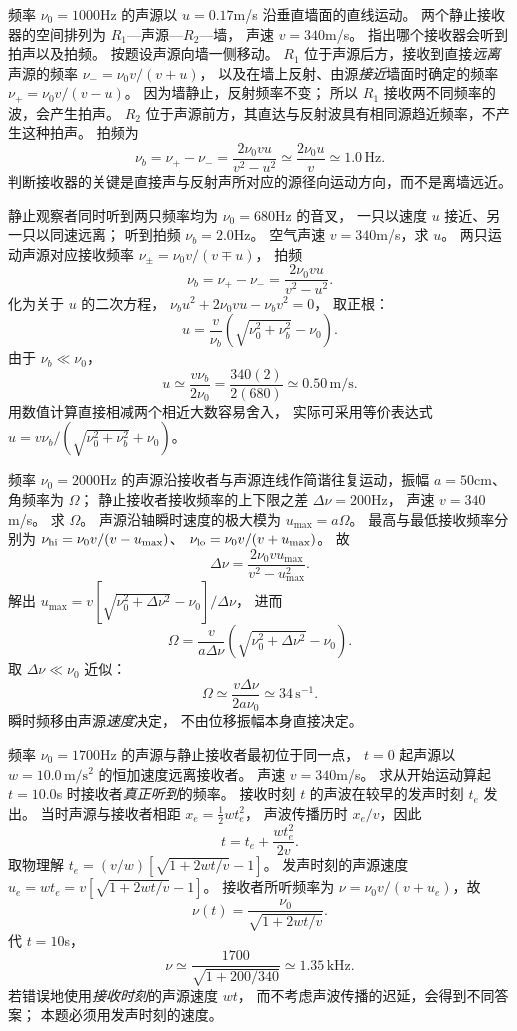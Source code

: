 频率 $\nu_0=1000$Hz 的声源以
$u=0.17$m/s 沿垂直墙面的直线运动。
两个静止接收器的空间排列为
$R_1$—声源—$R_2$—墙，
声速 $v=340$m/s。
指出哪个接收器会听到拍声以及拍频。
\exsolution
按题设声源向墙一侧移动。
$R_1$ 位于声源后方，接收到直接\emph{远离}声源的频率
$\nu_-= \nu_0v/(v+u)$，
以及在墙上反射、由源\emph{接近}墙面时确定的频率
$\nu_+=\nu_0v/(v-u)$。
因为墙静止，反射频率不变；
所以 $R_1$ 接收两不同频率的波，会产生拍声。
$R_2$ 位于声源前方，其直达与反射波具有相同源趋近频率，不产生这种拍声。
拍频为
\[
\boxed{\nu_b=\nu_+-\nu_-=
\frac{2\nu_0vu}{v^2-u^2}
\simeq\frac{2\nu_0u}{v}
\simeq1.0\,\mathrm{Hz}}.
\]
\excheck 判断接收器的关键是直接声与反射声所对应的源径向运动方向，而不是离墙远近。

静止观察者同时听到两只频率均为
$\nu_0=680$Hz 的音叉，
一只以速度 $u$ 接近、另一只以同速远离；
听到拍频
$\nu_b=2.0$Hz。
空气声速 $v=340$m/s，求 $u$。
\exsolution
两只运动声源对应接收频率
$\nu_\pm=\nu_0v/(v\mp u)$，
拍频
\[
\nu_b=\nu_+-\nu_-
=\frac{2\nu_0vu}{v^2-u^2}.
\]
化为关于 $u$ 的二次方程，
$\nu_bu^2+2\nu_0vu-\nu_bv^2=0$，
取正根：
\[
\boxed{u=\frac v{\nu_b}
\left(\sqrt{\nu_0^2+\nu_b^2}-\nu_0\right)}.
\]
由于 $\nu_b\ll\nu_0$，
\[
\boxed{u\simeq\frac{v\nu_b}{2\nu_0}
=\frac{340(2)}{2(680)}
\simeq0.50\,\mathrm{m/s}}.
\]
\excheck 用数值计算直接相减两个相近大数容易舍入，
实际可采用等价表达式
$u=v\nu_b/(\sqrt{\nu_0^2+\nu_b^2}+\nu_0)$。

频率 $\nu_0=2000$Hz 的声源沿接收者与声源连线作简谐往复运动，振幅 $a=50$cm、角频率为 $\Omega$；
静止接收者接收频率的上下限之差
$\Delta\nu=200$Hz，
声速 $v=340$m/s。
求 $\Omega$。
\exsolution
声源沿轴瞬时速度的极大模为
$u_{\max}=a\Omega$。
最高与最低接收频率分别为
$\nu_{\rm hi}=\nu_0v/(v-u_{\max})$、
$\nu_{\rm lo}=\nu_0v/(v+u_{\max})$。
故
\[
\Delta\nu=
\frac{2\nu_0v u_{\max}}{v^2-u_{\max}^2}.
\]
解出
$u_{\max}=v[\sqrt{\nu_0^2+\Delta\nu^2}-\nu_0]/\Delta\nu$，
进而
\[
\boxed{\Omega=\frac v{a\Delta\nu}
\left(\sqrt{\nu_0^2+\Delta\nu^2}-\nu_0\right)}.
\]
取 $\Delta\nu\ll\nu_0$ 近似：
\[
\boxed{\Omega\simeq\frac{v\Delta\nu}
{2a\nu_0}\simeq34\,\mathrm{s^{-1}}}.
\]
\excheck 瞬时频移由声源\emph{速度}决定，
不由位移振幅本身直接决定。

频率 $\nu_0=1700$Hz 的声源与静止接收者最初位于同一点，
$t=0$ 起声源以
$w=10.0\,\mathrm{m/s^2}$ 的恒加速度远离接收者。
声速 $v=340$m/s。
求从开始运动算起 $t=10.0$s 时接收者\emph{真正听到}的频率。
\exsolution
接收时刻 $t$ 的声波在较早的发声时刻
$t_e$ 发出。
当时声源与接收者相距
$x_e=\tfrac12wt_e^2$，
声波传播历时 $x_e/v$，因此
\[
t=t_e+\frac{wt_e^2}{2v}.
\]
取物理解
$t_e=(v/w)[\sqrt{1+2wt/v}-1]$。
发声时刻的声源速度
$u_e=wt_e=v[\sqrt{1+2wt/v}-1]$。
接收者所听频率为
$\nu=\nu_0v/(v+u_e)$，故
\[
\boxed{\nu(t)=
\frac{\nu_0}{\sqrt{1+2wt/v}}}.
\]
代 $t=10$s，
\[
\boxed{\nu\simeq
\frac{1700}{\sqrt{1+200/340}}
\simeq1.35\,\mathrm{kHz}}.
\]
\excheck 若错误地使用\emph{接收时刻}的声源速度 $wt$，
而不考虑声波传播的迟延，会得到不同答案；
本题必须用发声时刻的速度。

